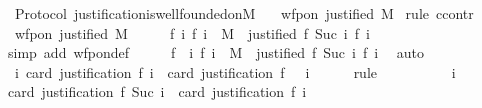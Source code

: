 \begin{isabellebody}
%
\isadelimproof
\isanewline
%
\endisadelimproof
\isanewline
\isanewline
{}\isamarkupfalse%
\ {\isacharparenleft}\ Protocol{\isacharparenright}\ justification{\isacharunderscore}is{\isacharunderscore}well{\isacharunderscore}founded{\isacharunderscore}on{\isacharunderscore}M\ {\isacharcolon}\isanewline
\ \ {\isachardoublequoteopen}wfp{\isacharunderscore}on\ justified\ M{\isachardoublequoteclose}\isanewline
%
\isadelimproof
%
\endisadelimproof
%
\isatagproof
{}\isamarkupfalse%
\ {\isacharparenleft}rule\ ccontr{\isacharparenright}\ \isanewline
\ \ \isamarkupfalse%
\ {\isachardoublequoteopen}{\isasymnot}\ wfp{\isacharunderscore}on\ justified\ M{\isachardoublequoteclose}\isanewline
\ \ \isamarkupfalse%
\ \isamarkupfalse%
\ {\isachardoublequoteopen}{\isasymexists}f{\isachardot}\ {\isasymforall}i{\isachardot}\ f\ i\ {\isasymin}\ M\ {\isasymand}\ justified\ {\isacharparenleft}f\ {\isacharparenleft}Suc\ i{\isacharparenright}{\isacharparenright}\ {\isacharparenleft}f\ i{\isacharparenright}{\isachardoublequoteclose}\isanewline
\ \ \ \ \isamarkupfalse%
\ {\isacharparenleft}simp\ add{\isacharcolon}\ wfp{\isacharunderscore}on{\isacharunderscore}def{\isacharparenright}\isanewline
\ \ \isamarkupfalse%
\ \isamarkupfalse%
\ f\ \ {\isachardoublequoteopen}{\isasymforall}i{\isachardot}\ f\ i\ {\isasymin}\ M\ {\isasymand}\ justified\ {\isacharparenleft}f\ {\isacharparenleft}Suc\ i{\isacharparenright}{\isacharparenright}\ {\isacharparenleft}f\ i{\isacharparenright}{\isachardoublequoteclose}\ \isamarkupfalse%
\ auto\isanewline
\ \ \isamarkupfalse%
\ {\isachardoublequoteopen}{\isasymforall}\ i{\isachardot}\ card\ {\isacharparenleft}justification\ {\isacharparenleft}f\ i{\isacharparenright}{\isacharparenright}\ {\isasymle}\ card\ {\isacharparenleft}justification\ {\isacharparenleft}f\ {}{\isacharparenright}{\isacharparenright}\ {\isacharminus}\ i{\isachardoublequoteclose}\isanewline
\ \ \ \ \isamarkupfalse%
\ {\isacharparenleft}rule{\isacharparenright}\isanewline
\ \ \isamarkupfalse%
\ {\isacharminus}\isanewline
\ \ \ \ \isamarkupfalse%
\ i\isanewline
\ \ \ \ \isamarkupfalse%
\ {\isachardoublequoteopen}card\ {\isacharparenleft}justification\ {\isacharparenleft}f\ {\isacharparenleft}Suc\ i{\isacharparenright}{\isacharparenright}{\isacharparenright}\ {\isacharless}\ card\ {\isacharparenleft}justification\ {\isacharparenleft}f\ i{\isacharparenright}{\isacharparenright}{\isachardoublequoteclose}\isanewline

\end{isabellebody}
